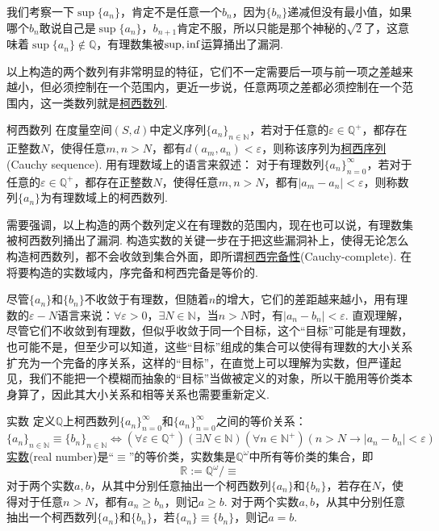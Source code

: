 我们考察一下\(\sup\{a_n\}\)，肯定不是任意一个\(b_n\)，因为\(\{b_n\}\)递减但没有最小值，如果哪个\(b_n\)敢说自己是\(\sup\{a_n\}\)，\(b_{n+1}\)肯定不服，所以只能是那个神秘的\(\sqrt{2}\)了，这意味着\(\sup\{a_n\}\not \in \mathbb{Q}\)，有理数集被\({\rm sup},{\rm inf}\)运算捅出了漏洞.

以上构造的两个数列有非常明显的特征，它们不一定需要后一项与前一项之差越来越小，但必须控制在一个范围内，更近一步说，任意两项之差都必须控制在一个范围内，这一类数列就是\underline{柯西数列}.
\begin{definition}{柯西数列}
    在度量空间\((S,d)\)中定义序列\(\{a_n\}_{n\in \mathbb{N}}\)，若对于任意的\(\varepsilon \in \mathbb{Q}^+\)，都存在正整数\(N\)，使得任意\(m,n>N\)，都有\(d(a_{m},a_{n}) < \varepsilon\)，则称该序列为\underline{柯西序列}(Cauchy sequence).
    \newline
    用有理数域上的语言来叙述：
        对于有理数列\(\{a_n\}_{n=0}^{\infty}\)，若对于任意的\(\varepsilon \in \mathbb{Q}^+\)，都存在正整数\(N\)，使得任意\(m,n>N\)，都有\(|a_{m}-a_{n}| < \varepsilon\)，则称数列\(\{a_n\}\)为有理数域上的柯西数列.
\end{definition}
需要强调，以上构造的两个数列定义在有理数的范围内，现在也可以说，有理数集被柯西数列捅出了漏洞. 构造实数的关键一步在于把这些漏洞补上，使得无论怎么构造柯西数列，都不会收敛到集合外面，即所谓\underline{柯西完备性}(Cauchy-complete). 在将要构造的实数域内，序完备和柯西完备是等价的.

尽管\(\{a_n\}\)和\(\{b_n\}\)不收敛于有理数，但随着\(n\)的增大，它们的差距越来越小，用有理数的\(\varepsilon-N\)语言来说：\(\forall \varepsilon > 0\)，\(\exists N\in \mathbb{N}\)，当\(n > N\)时，有\(|a_n-b_n|<\varepsilon\). 直观理解，尽管它们不收敛到有理数，但似乎收敛于同一个目标，这个“目标”可能是有理数，也可能不是，但至少可以知道，这些“目标”组成的集合可以使得有理数的大小关系扩充为一个完备的序关系，这样的“目标”，在直觉上可以理解为实数，但严谨起见，我们不能把一个模糊而抽象的“目标”当做被定义的对象，所以干脆用等价类本身算了，因此其大小关系和相等关系也需要重新定义.

\begin{definition}{实数}
    定义\(\mathbb{Q}\)上柯西数列\(\{a_n\}_{n=0}^{\infty}\)和\(\{a_n\}_{n=0}^{\infty}\)之间的等价关系：
    \[\{a_n\}_{n \in \mathbb{N}} \equiv \{b_n\}_{n \in \mathbb{N}} \Leftrightarrow (\forall \varepsilon \in \mathbb{Q}^+)(\exists N \in \mathbb{N})(\forall n \in \mathbb{N}^+)(n > N \rightarrow |a_n-b_n|<\varepsilon)\]
    \underline{实数}(real number)是“\(\equiv\)”的等价类，实数集是\(\mathbb{Q}^\omega\)中所有等价类的集合，即
    \[\mathbb{R} := \mathbb{Q}^\omega / \equiv\]
    对于两个实数\(a,b\)，从其中分别任意抽出一个柯西数列\(\{a_n\}\)和\(\{b_n\}\)，若存在\(N\)，使得对于任意\(n>N\)，都有\(a_n \geq b_n\)，则记\(a \geq b\).
    \newline
    对于两个实数\(a,b\)，从其中分别任意抽出一个柯西数列\(\{a_n\}\)和\(\{b_n\}\)，若\(\{a_n\} \equiv \{b_n\}\)，则记\(a=b\).
\end{definition}

